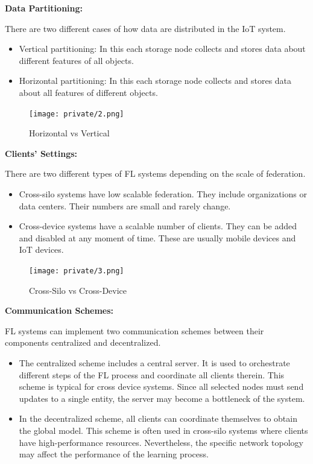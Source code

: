 \documentclass[14pt]{extarticle}
\begin{document}
\textbf{Data Partitioning:}

\par There are two different cases of how data are distributed in the IoT system.
\begin{itemize}
    \item Vertical partitioning: In this each storage node collects and stores data about different features of all objects.
    \item Horizontal partitioning: In this each storage node collects and stores data about all features of different objects.
\end{itemize}

\begin{figure}[!h]
    \centering
    \texttt{[image: private/2.png]}
    \caption{Horizontal vs Vertical}
    \label{fig:hdpVSvdp}
\end{figure}

\textbf{Clients’ Settings:}
\par There are two different types of FL systems depending on the scale of federation.
\begin{itemize}
    \item Cross-silo systems have low scalable federation. They include organizations or data centers. Their numbers are small and rarely change.
    \item Cross-device systems have a scalable number of clients. They can be added and disabled at any moment of time. These are usually mobile devices and IoT devices.
\end{itemize}

\begin{figure}[!h]
    \centering
    \texttt{[image: private/3.png]}
    \caption{Cross-Silo vs Cross-Device}
    \label{fig:cssiloVScsdev}
\end{figure}

\newpage
\textbf{Communication Schemes:}

\par FL systems can implement two communication schemes between their components centralized and decentralized.

\begin{itemize}
    \item The centralized scheme includes a central server. It is used to orchestrate different steps of the FL process and coordinate all clients therein. This scheme is typical for cross device systems. Since all selected nodes must send updates to a single entity, the server may become a bottleneck of the system.
    \item In the decentralized scheme, all clients can coordinate themselves to obtain the global model. This scheme is often used in cross-silo systems where clients have high-performance resources. Nevertheless, the specific network topology may affect the performance of the learning process.
\end{itemize}
\end{document}
